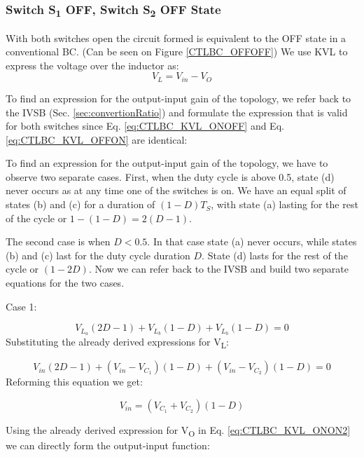 \subsubsection{Switch S\textsubscript{1} OFF, Switch S\textsubscript{2} OFF State}
With both switches open the circuit formed is equivalent to the OFF state in a conventional BC. (Can be seen on Figure \ref{CTLBC_OFFOFF}) We use KVL to express the voltage over the inductor as: 
\begin{equation}
	V_{L}=V_{in}-V_{O}
	\label{eq:CTLBC_KVL_OFFOFF}
\end{equation}


To find an expression for the output-input gain of the topology, we refer back to the IVSB (Sec. \ref{sec:convertionRatio}) and formulate the expression that is valid for both switches since Eq. \ref{eq:CTLBC_KVL_ONOFF} and Eq. \ref{eq:CTLBC_KVL_OFFON} are identical:

To find an expression for the output-input gain of the topology, we 
have to observe two separate cases. First, when the duty cycle is above 0.5, state (d) never occurs as at any time one of the switches is on. We have an equal split of states (b) and (c) for a duration of $(1-D)T_S$, with state (a) lasting for the rest of the cycle or $1-(1-D)=2(D-1)$.

The second case is when $D<0.5$. In that case state (a) never occurs, while states (b) and (c) last for the duty cycle duration $D$. State (d) lasts for the rest of the cycle or $(1-2D)$.
Now we can refer back to the IVSB and build two separate equations for the two cases. 

Case 1: 

\begin{equation}
	V_{L_a}(2D-1)+V_{L_b}(1-D)+V_{L_b}(1-D)=0
	\label{eq:CTLBC_IVSB}
\end{equation}
Substituting the already derived expressions for V\textsubscript{L}:

\begin{equation}
	V_{in}(2D-1)+(V_{in} - V_{C_1})(1-D)+(V_{in} - V_{C_2})(1-D)=0
	\label{eq:CTLBC_IVSB2}
\end{equation}
Reforming this equation we get: 

\begin{equation}
	V_{in}=(V_{C_1} + V_{C_2})(1-D)
	\label{eq:CTLBC_IVSB3}
\end{equation}

Using the already derived expression for V\textsubscript{O} in Eq. \ref{eq:CTLBC_KVL_ONON2} we can directly form the output-input function: 

